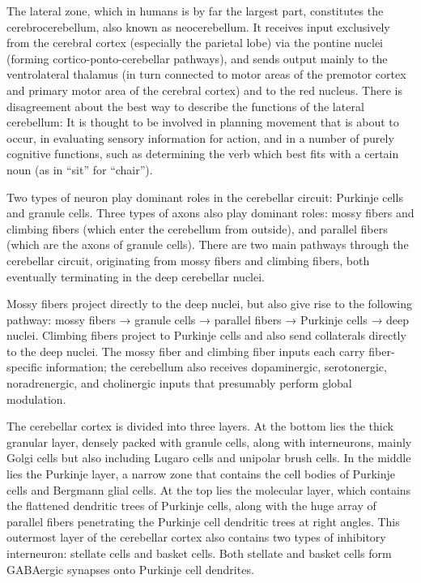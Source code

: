 The lateral zone, which in humans is by far the largest part, constitutes the cerebrocerebellum, also known as neocerebellum. It receives input exclusively from the cerebral cortex (especially the parietal lobe) via the pontine nuclei (forming cortico-ponto-cerebellar pathways), and sends output mainly to the ventrolateral thalamus (in turn connected to motor areas of the premotor cortex and primary motor area of the cerebral cortex) and to the red nucleus. There is disagreement about the best way to describe the functions of the lateral cerebellum: It is thought to be involved in planning movement that is about to occur, in evaluating sensory information for action, and in a number of purely cognitive functions, such as determining the verb which best fits with a certain noun (as in ``sit'' for ``chair'').

Two types of neuron play dominant roles in the cerebellar circuit: Purkinje cells and granule cells. Three types of axons also play dominant roles: mossy fibers and climbing fibers (which enter the cerebellum from outside), and parallel fibers (which are the axons of granule cells). There are two main pathways through the cerebellar circuit, originating from mossy fibers and climbing fibers, both eventually terminating in the deep cerebellar nuclei.

Mossy fibers project directly to the deep nuclei, but also give rise to the following pathway: mossy fibers → granule cells → parallel fibers → Purkinje cells → deep nuclei. Climbing fibers project to Purkinje cells and also send collaterals directly to the deep nuclei. The mossy fiber and climbing fiber inputs each carry fiber-specific information; the cerebellum also receives dopaminergic, serotonergic, noradrenergic, and cholinergic inputs that presumably perform global modulation.

The cerebellar cortex is divided into three layers. At the bottom lies the thick granular layer, densely packed with granule cells, along with interneurons, mainly Golgi cells but also including Lugaro cells and unipolar brush cells. In the middle lies the Purkinje layer, a narrow zone that contains the cell bodies of Purkinje cells and Bergmann glial cells. At the top lies the molecular layer, which contains the flattened dendritic trees of Purkinje cells, along with the huge array of parallel fibers penetrating the Purkinje cell dendritic trees at right angles. This outermost layer of the cerebellar cortex also contains two types of inhibitory interneuron: stellate cells and basket cells. Both stellate and basket cells form GABAergic synapses onto Purkinje cell dendrites.

